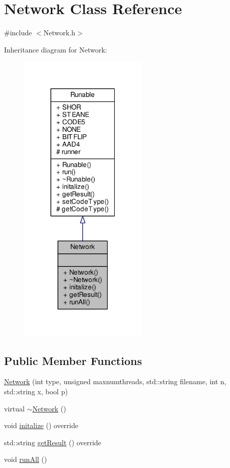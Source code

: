 \hypertarget{class_network}{}\section{Network Class Reference}
\label{class_network}


{\ttfamily \#include $<$Network.\+h$>$}



Inheritance diagram for Network\+:\nopagebreak
\begin{figure}[H]
\begin{center}
\leavevmode
\includegraphics[width=175pt]{class_network__inherit__graph}
\end{center}
\end{figure}
\subsection*{Public Member Functions}
\begin{DoxyCompactItemize}
\item 
\hyperlink{class_network_a7d15ac5c7574b7cf8184e9efd2f5af22}{Network} (int type, unsigned maxnumthreads, std\+::string filename, int n, std\+::string x, bool p)
\item 
virtual \hyperlink{class_network_a7a4e19cdb4bf0c7ecf82baa643831492}{$\sim$\+Network} ()
\item 
void \hyperlink{class_network_aac12b9028bdef1c44984b1c8e111e69d}{initalize} () override
\item 
std\+::string \hyperlink{class_network_a8bd2e1e2117b07661a149b7e6debb99d}{get\+Result} () override
\item 
void \hyperlink{class_network_a10a99f08c6d2f7f019c83b0899a0c56c}{run\+All} ()
\end{DoxyCompactItemize}
